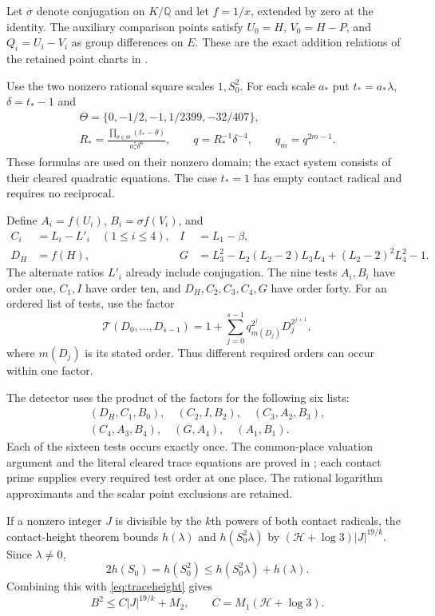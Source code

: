 \documentclass[11pt,a4paper]{article}
\theoremstyle{remark}\newtheorem{remark}[theorem]{Remark}
\newcommand{\Q}{\mathbb Q}\newcommand{\Z}{\mathbb Z}\newcommand{\HH}{\mathcal H}
\begin{document}
Let $\sigma$ denote conjugation on $K/\Q$ and let $f=1/x$, extended
by zero at the identity. The auxiliary comparison points satisfy
$U_0=H$, $V_0=H-P$, and $Q_i=U_i-V_i$ as group differences on $E$.
These are the exact addition relations of the retained point charts
in \cite{Baseline}.

Use the two nonzero rational square scales $1,S_0^2$. For each
scale $a_*$ put $t_*=a_*\lambda$, $\delta=t_*-1$ and
\[
 \begin{gathered}
 \Theta=\{0,-1/2,-1,1/2399,-32/407\},\\
 R_* =\frac{\prod_{\theta\in\Theta}(t_*-\theta)}{a_*^5\delta^6},
 \qquad q=R_*^{-1}\delta^{-4},\qquad q_m=q^{2m-1}.
 \end{gathered}
\]
These formulas are used on their nonzero domain; the exact system
consists of their cleared quadratic equations. The case $t_*=1$
has empty contact radical and requires no reciprocal.

Define $A_i=f(U_i)$, $B_i=\sigma f(V_i)$, and
\[
 \begin{aligned}
 C_i&=L_i-L'_i\quad(1\le i\le4),& I&=L_1-\beta,\\
 D_H&=f(H),&G&=L_3^2-L_2(L_2-2)L_3L_4+(L_2-2)^2L_4^2-1.
 \end{aligned}
\]
The alternate ratios $L'_i$ already include conjugation. The nine tests
$A_i,B_i$ have order one, $C_1,I$ have order ten, and $D_H,C_2,C_3,C_4,G$
have order forty. For an ordered list of tests, use the factor
\[
 \mathcal T(D_0,\ldots,D_{s-1})
 =1+\sum_{j=0}^{s-1}q_{m(D_j)}^{2^j}D_j^{2^{j+1}},
\]
where $m(D_j)$ is its stated order. Thus different required orders can
occur within one factor.

The detector uses the product of the factors for the following six lists:
\[
 \begin{gathered}
 (D_H,C_1,B_0),\quad(C_2,I,B_2),\quad(C_3,A_2,B_3),\\
 (C_4,A_3,B_4),\quad(G,A_4),\quad(A_1,B_1).
 \end{gathered}
\]
Each of the sixteen tests occurs exactly once. The common-place valuation
argument and the literal cleared trace equations are proved in
\cite[Proposition~2.3]{Shared}; each contact prime supplies every required test order
at one place. The rational logarithm approximants and the scalar point
exclusions are retained.

If a nonzero integer $J$ is divisible by the $k$th powers of both
contact radicals, the contact-height theorem bounds
$h(\lambda)$ and $h(S_0^2\lambda)$ by
$(\HH+\log3)|J|^{19/k}$. Since $\lambda\ne0$,
\[
 2h(S_0)=h(S_0^2)\le h(S_0^2\lambda)+h(\lambda).
\]
Combining this with \eqref{eq:traceheight} gives
\begin{equation}\label{eq:height}
 B^2\le C|J|^{19/k}+M_2,
 \qquad C=M_1(\HH+\log3).
\end{equation}
\end{document}
